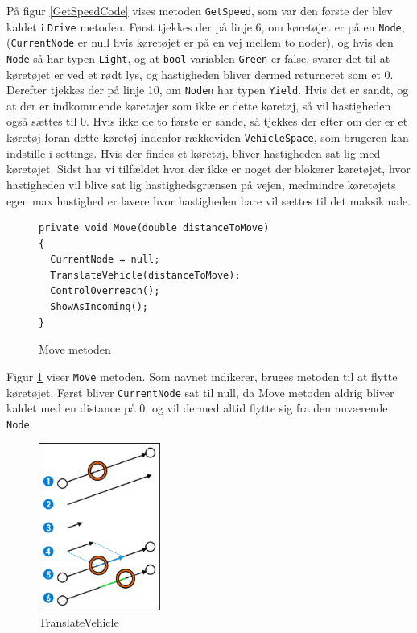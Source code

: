 På figur \ref{GetSpeedCode} vises metoden \texttt{GetSpeed}, som var den første der blev kaldet i \texttt{Drive} metoden. Først tjekkes der på linje 6, om køretøjet er på en \texttt{Node}, (\texttt{CurrentNode} er null hvis køretøjet er på en vej mellem to noder), og hvis den \texttt{Node} så har typen \texttt{Light}, og at \texttt{bool} variablen \texttt{Green} er false, svarer det til at køretøjet er ved et rødt lys, og hastigheden bliver dermed returneret som et 0. Derefter tjekkes der på linje 10, om \texttt{Noden} har typen \texttt{Yield}. Hvis det er sandt, og at der er indkommende køretøjer som ikke er dette køretøj, så vil hastigheden også sættes til 0. Hvis ikke de to første er sande, så tjekkes der efter om der er et køretøj foran dette køretøj indenfor rækkeviden \texttt{VehicleSpace}, som brugeren kan indstille i settings. Hvis der findes et køretøj, bliver hastigheden sat lig med køretøjet. Sidst har vi tilfældet hvor der ikke er noget der blokerer køretøjet, hvor hastigheden vil blive sat lig hastighedsgrænsen på vejen, medmindre køretøjets egen max hastighed er lavere hvor hastigheden bare vil sættes til det maksikmale.

\begin{figure}[H]
\begin{lstlisting}
private void Move(double distanceToMove)
{
  CurrentNode = null;
  TranslateVehicle(distanceToMove);
  ControlOverreach();
  ShowAsIncoming();
}
\end{lstlisting}
\caption{Move metoden}\label{MoveCode}
\end{figure}

Figur \ref{MoveCode} viser \texttt{Move} metoden. Som navnet indikerer, bruges metoden til at flytte køretøjet. Først bliver \texttt{CurrentNode} sat til null, da Move metoden aldrig bliver kaldet med en distance på 0, og vil dermed altid flytte sig fra den nuværende \texttt{Node}. 

\begin{figure}
    \centering
    \includegraphics[width=4cm,keepaspectratio]{Pictures/Implementation/TranslateVehicle}
    \caption{TranslateVehicle}
    \label{TranslateVehicle}
\end{figure}


